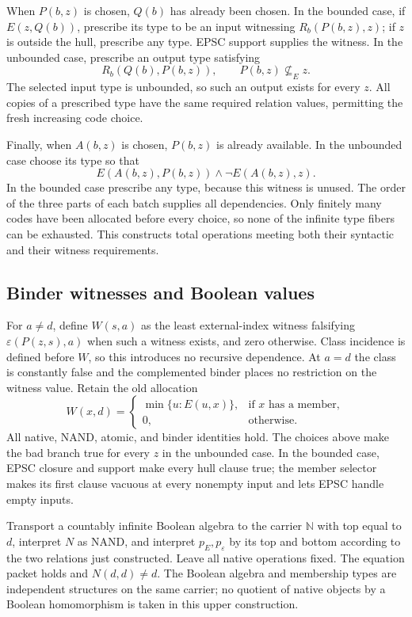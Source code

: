 When $P(b,z)$ is chosen, $Q(b)$ has already been chosen.  In the bounded
case, if $E(z,Q(b))$, prescribe its type to be an input witnessing
$R_b(P(b,z),z)$; if $z$ is outside the hull, prescribe any type.  EPSC
support supplies the witness.  In the unbounded case, prescribe an
output type satisfying
\[
  R_b(Q(b),P(b,z)),\qquad P(b,z)\not\subseteq_E z.
\]
The selected input type is unbounded, so such an output exists for every
$z$.  All copies of a prescribed type have the same required relation
values, permitting the fresh increasing code choice.

Finally, when $A(b,z)$ is chosen, $P(b,z)$ is already available.  In the
unbounded case choose its type so that
\[
                  E(A(b,z),P(b,z))\land\neg E(A(b,z),z).
\]
In the bounded case prescribe any type, because this witness is unused.
The order of the three parts of each batch supplies all dependencies.
Only finitely many codes have been allocated before every choice, so
none of the infinite type fibers can be exhausted.  This constructs total
operations meeting both their syntactic and their witness requirements.

\subsection*{Binder witnesses and Boolean values}

For $a\ne d$, define $W(s,a)$ as the least external-index witness
falsifying $\varepsilon(P(z,s),a)$ when such a witness exists, and zero
otherwise.  Class incidence is defined before $W$, so this introduces no
recursive dependence.  At $a=d$ the class is constantly false and the
complemented binder places no restriction on the witness value.  Retain
the old allocation
\[
 W(x,d)=\begin{cases}
    \min\{u:E(u,x)\},&\text{if $x$ has a member},\\
    0,&\text{otherwise}.
 \end{cases}
\]
All native, NAND, atomic, and binder identities hold.  The choices above
make the bad branch true for every $z$ in the unbounded case.  In the
bounded case, EPSC closure and support make every hull clause true;
the member selector makes its first clause vacuous at every nonempty
input and lets EPSC handle empty inputs.

Transport a countably infinite Boolean algebra to the carrier
$\mathbb N$ with top equal to $d$, interpret $N$ as NAND, and interpret
$p_E,p_\varepsilon$ by its top and bottom according to the two relations
just constructed.  Leave all native operations fixed.  The equation
packet holds and $N(d,d)\ne d$.  The Boolean algebra and membership types
are independent structures on the same carrier; no quotient of native
objects by a Boolean homomorphism is taken in this upper construction.

